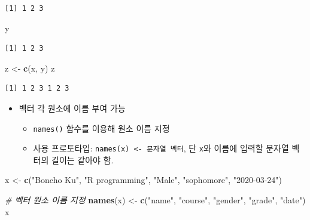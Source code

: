 \documentclass[
  11pt,
]{krantz}
\newenvironment{Shaded}{\begin{snugshade}}{\end{snugshade}}
\newcommand{\CommentTok}[1]{\textcolor[rgb]{0.37,0.37,0.37}{\textit{#1}}}
\newcommand{\KeywordTok}[1]{\textcolor[rgb]{0.27,0.27,0.27}{\textbf{#1}}}
\newcommand{\NormalTok}[1]{#1}
\newcommand{\StringTok}[1]{\textcolor[rgb]{0.5,0.5,0.5}{#1}}
\providecommand{\tightlist}{%
  \setlength{\itemsep}{0pt}\setlength{\parskip}{0pt}}
\begin{document}
\begin{verbatim}
[1] 1 2 3
\end{verbatim}

\begin{Shaded}
\begin{Highlighting}[]
\NormalTok{y}
\end{Highlighting}
\end{Shaded}

\begin{verbatim}
[1] 1 2 3
\end{verbatim}

\begin{Shaded}
\begin{Highlighting}[]
\NormalTok{z <-}\StringTok{ }\KeywordTok{c}\NormalTok{(x, y)}
\NormalTok{z}
\end{Highlighting}
\end{Shaded}

\begin{verbatim}
[1] 1 2 3 1 2 3
\end{verbatim}

\normalsize

\begin{itemize}
\tightlist
\item
  벡터 각 원소에 이름 부여 가능

  \begin{itemize}
  \tightlist
  \item
    \texttt{names()} 함수를 이용해 원소 이름 지정
  \item
    사용 프로토타입: \texttt{names(x)\ \textless{}-\ 문자열\ 벡터}, 단 \texttt{x}와 이름에 입력할 문자열 벡터의 길이는 같아야 함.
  \end{itemize}
\end{itemize}

\footnotesize

\begin{Shaded}
\begin{Highlighting}[]
\NormalTok{x <-}\StringTok{ }\KeywordTok{c}\NormalTok{(}\StringTok{"Boncho Ku"}\NormalTok{, }\StringTok{"R programming"}\NormalTok{, }\StringTok{"Male"}\NormalTok{, }\StringTok{"sophomore"}\NormalTok{, }\StringTok{"2020-03-24"}\NormalTok{)}

\CommentTok{# 벡터 원소 이름 지정}
\KeywordTok{names}\NormalTok{(x) <-}\StringTok{ }\KeywordTok{c}\NormalTok{(}\StringTok{"name"}\NormalTok{, }\StringTok{"course"}\NormalTok{, }\StringTok{"gender"}\NormalTok{, }\StringTok{"grade"}\NormalTok{, }\StringTok{"date"}\NormalTok{) }
\NormalTok{x}
\end{Highlighting}
\end{Shaded}
\end{document}
